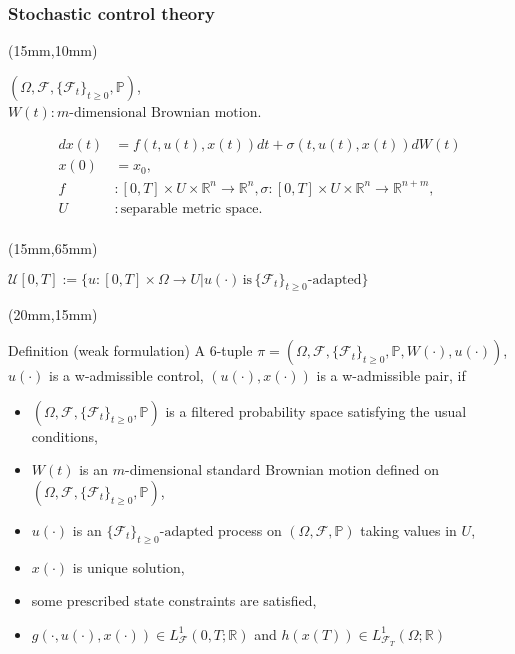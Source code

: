 \begin{frame}[plain]
	\frametitle{Stochastic control theory}
	\begin{textblock*}{100mm}(15mm,10mm)
		\begin{graybox}{}
			$(\Omega,\mathscr{F},\{\mathscr{F}_t\}_{t\geq 0},\mathbb{P})$,\\ $W(t):m\text{-dimensional Brownian motion}$.
			
			\begin{align*}
				dx(t)&=
				f(t,u(t),x(t))dt+\sigma(t,u(t),x(t))dW(t)\\
				x(0)&=
				x_0,\\
				f&:
				[0,T]\times U\times\mathbb{R}^n\rightarrow\mathbb{R}^n, \sigma:[0,T]\times U\times\mathbb{R}^n\rightarrow\mathbb{R}^{n+m},\\
				U&:
				\text{separable metric space}.\\
			\end{align*}
		\end{graybox}
	\end{textblock*}

	\begin{textblock*}{100mm}(15mm,65mm)
		\begin{yellowbox}{}
			$\mathcal{U}[0,T]:=\{u:[0,T]\times\Omega\rightarrow U | u(\cdot)\,\text{is}\,\{\mathscr{F}_t\}_{t\geq 0}\text{-adapted}\}$
		\end{yellowbox}
	\end{textblock*}
\end{frame}
\begin{frame}[plain]
	\begin{textblock*}{90mm}(20mm,15mm)
		\begin{graybox}{Definition (weak formulation)}
			 A 6-tuple $\pi=(\Omega,\mathscr{F},\{\mathscr{F}_t\}_{t\geq 0},\mathbb{P},W(\cdot),u(\cdot))$, $u(\cdot)$ is  a w-admissible control, $(u(\cdot),x(\cdot))$ is a w-admissible pair, if
			\begin{itemize}
				\item $(\Omega,\mathscr{F},\{\mathscr{F}_t\}_{t\geq 0},\mathbb{P})$ is a filtered probability space satisfying the usual conditions,
				\item $W(t)$ is an $m$-dimensional standard Brownian motion defined on $(\Omega,\mathscr{F},\{\mathscr{F}_t\}_{t\geq 0},\mathbb{P})$,
				\item $u(\cdot)$ is an $\{\mathscr{F}_t\}_{t\geq 0}\text{-adapted}$ process on $(\Omega,\mathscr{F},\mathbb{P})$ taking values in $U$,
				\item $x(\cdot)$ is unique solution,
				\item some prescribed state constraints are satisfied,
				\item $g(\cdot,u(\cdot),x(\cdot))\in L^1_{\mathscr{F}}(0,T;\mathbb{R})$ and $h(x(T))\in L^1_{\mathscr{F}_T}(\Omega;\mathbb{R})$
			\end{itemize}
		\end{graybox}
	\end{textblock*}
\end{frame}
